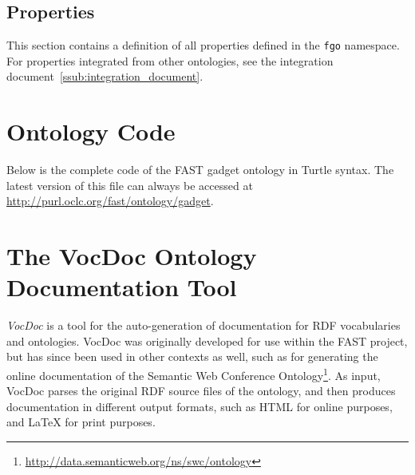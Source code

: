 \documentclass{article}
\begin{document}
\singlespacing
\begin{small}

\end{small}
\doublespacing


\subsection{Properties} %
\label{sub:properties}

This section contains a definition of all properties defined in the \texttt{fgo} namespace. For properties integrated from other ontologies, see the integration document~\ref{ssub:integration_document}.

\singlespacing
\begin{small}

\end{small}
\doublespacing



\clearpage
{}
\section{Ontology Code}
\label{sec:ontology_code}

Below is the complete code of the FAST gadget ontology in Turtle syntax. The latest version of this file can always be accessed at \url{http://purl.oclc.org/fast/ontology/gadget}.

\singlespacing
% 


\doublespacing
\clearpage
{}
\section{The VocDoc Ontology Documentation Tool}
\label{sec:vocdoc}

\emph{VocDoc} is a tool for the auto-generation of documentation for RDF vocabularies and ontologies. VocDoc was originally developed for use within the FAST project, but has since been used in other contexts as well, such as for generating the online documentation of the Semantic Web Conference Ontology\footnote{\url{http://data.semanticweb.org/ns/swc/ontology}}. As input, VocDoc parses the original RDF source files of the ontology, and then produces documentation in different output formats, such as HTML for online purposes, and La\TeX{} for print purposes.
\end{document}

